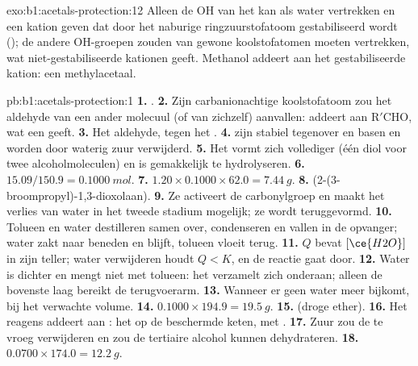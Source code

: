\begin{solution}{exo:b1:acetals-protection:12}
Alleen de OH van het  kan als water vertrekken en een kation
geven dat door het naburige ringzuurstofatoom gestabiliseerd wordt
(); de andere OH-groepen zouden van gewone koolstofatomen moeten
vertrekken, wat niet-gestabiliseerde kationen geeft. Methanol addeert aan
het gestabiliseerde kation: een methylacetaal.
\end{solution}

\begin{solution}{pb:b1:acetals-protection:1}
\textbf{1.} .
\textbf{2.} Zijn carbanionachtige koolstofatoom zou het aldehyde van een
ander molecuul (of van zichzelf) aanvallen:  addeert aan
$\mathrm{R'CHO}$, wat een  geeft.
\textbf{3.} Het aldehyde, tegen het .
\textbf{4.}  zijn stabiel tegenover  en basen en
worden door waterig zuur verwijderd.
\textbf{5.} Het vormt zich vollediger (één diol voor twee
alcoholmoleculen) en is gemakkelijk te hydrolyseren.
\textbf{6.} $15.09/150.9 = \qty{0.1000}{mol}$.
\textbf{7.} $1.20 \times 0.1000 \times 62.0 = \qty{7.44}{g}$.
\textbf{8.} 
(2-(3-broompropyl)-1,3-dioxolaan).
\textbf{9.} Ze activeert de carbonylgroep en maakt het verlies van water
in het tweede stadium mogelijk; ze wordt teruggevormd.
\textbf{10.} Tolueen en water destilleren samen over, condenseren en
vallen in de opvanger; water zakt naar beneden en blijft, tolueen vloeit
terug.
\textbf{11.} $Q$ bevat $[\ce{H2O}]$ in zijn teller; water verwijderen
houdt $Q < K$, en de reactie gaat door.
\textbf{12.} Water is dichter en mengt niet met tolueen: het verzamelt
zich onderaan; alleen de bovenste laag bereikt de terugvoerarm.
\textbf{13.} Wanneer er geen water meer bijkomt, bij het verwachte
volume.
\textbf{14.} $0.1000 \times 194.9 = \qty{19.5}{g}$.
\textbf{15.}  (droge ether).
\textbf{16.} Het reagens addeert aan : het 
 op de beschermde keten, met .
\textbf{17.} Zuur zou de  te vroeg verwijderen en zou
de tertiaire alcohol kunnen dehydrateren.
\textbf{18.} $0.0700 \times 174.0 = \qty{12.2}{g}$.

\end{solution}
